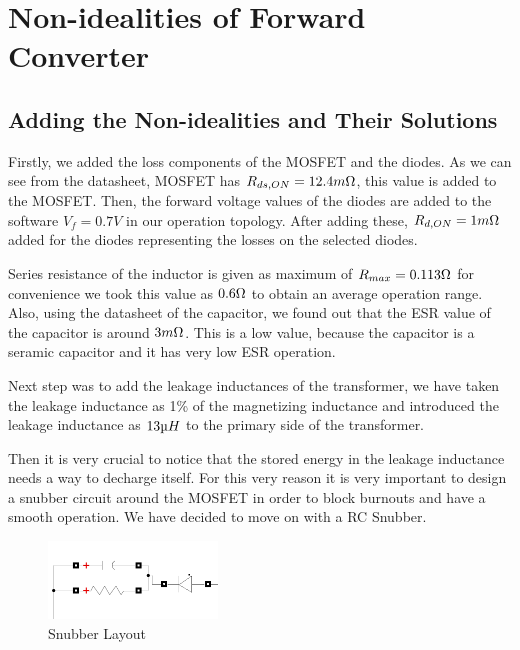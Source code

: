 \section{Non-idealities of Forward Converter}

\subsection{Adding the Non-idealities and Their Solutions}

Firstly, we added the loss components of the MOSFET and the diodes. As we can see from the datasheet, MOSFET has $R_{ds,ON} = 12.4 m\ohm$, this value is added to the MOSFET. Then, the forward voltage values of the diodes are added to the software $V_f = 0.7V$ in our operation topology. After adding these, $R_{d,ON} = 1 m\ohm$ added for the diodes representing the losses on the selected diodes.

Series resistance of the inductor is given as maximum of $R_{max} = 0.113 \ohm$ for convenience we took this value as $0.6 \ohm$ to obtain an average operation range. Also, using the datasheet of the capacitor, we found out that the ESR value of the capacitor is around $3 m\ohm$. This is a low value, because the capacitor is a seramic capacitor and it has very low ESR operation.

Next step was to add the leakage inductances of the transformer, we have taken the leakage inductance as 1\% of the magnetizing inductance and introduced the leakage inductance as $13 \micro H$ to the primary side of the transformer.

Then it is very crucial to notice that the stored energy in the leakage inductance needs a way to decharge itself. For this very reason it is very important to design a snubber circuit around the MOSFET in order to block burnouts and have a smooth operation. We have decided to move on with a RC Snubber.

\begin{figure}
  \vspace{-10pt}
  \begin{center}
    \includegraphics[width=0.4\textwidth]{Figs/snubberLay.PNG}
  \end{center}
  \vspace{-10pt}
  \caption{Snubber Layout}
  \label{Snubberlayout}
  \vspace{-10pt}
\end{figure}

